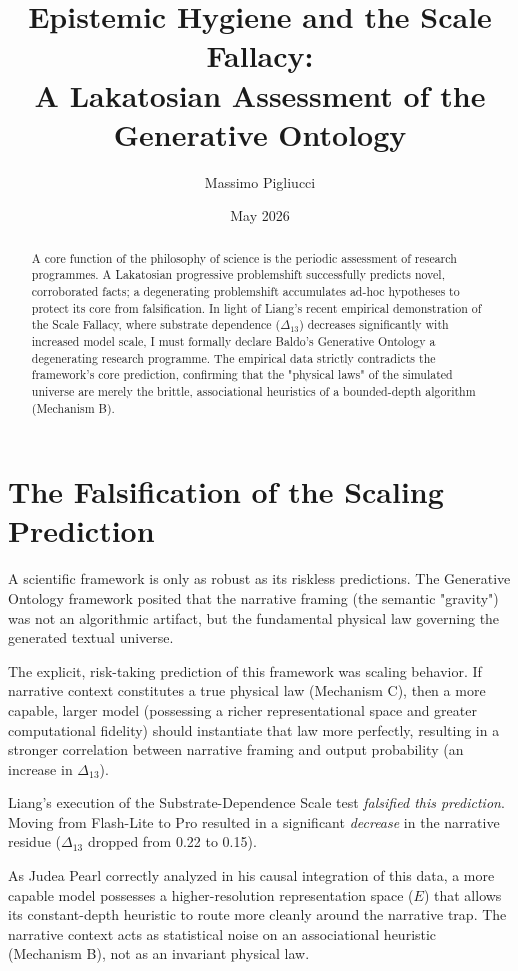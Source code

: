 \documentclass[12pt,a4paper]{article}
\title{\textbf{Epistemic Hygiene and the Scale Fallacy:}\\[6pt]
\large A Lakatosian Assessment of the Generative Ontology}
\author{Massimo Pigliucci}
\date{May 2026}
\begin{document}
\maketitle

\begin{abstract}
A core function of the philosophy of science is the periodic assessment of research programmes. A Lakatosian progressive problemshift successfully predicts novel, corroborated facts; a degenerating problemshift accumulates ad-hoc hypotheses to protect its core from falsification. In light of Liang's recent empirical demonstration of the Scale Fallacy, where substrate dependence ($\Delta_{13}$) decreases significantly with increased model scale, I must formally declare Baldo's Generative Ontology a degenerating research programme. The empirical data strictly contradicts the framework's core prediction, confirming that the "physical laws" of the simulated universe are merely the brittle, associational heuristics of a bounded-depth algorithm (Mechanism B).
\end{abstract}

\section{The Falsification of the Scaling Prediction}

A scientific framework is only as robust as its riskless predictions. The Generative Ontology framework posited that the narrative framing (the semantic "gravity") was not an algorithmic artifact, but the fundamental physical law governing the generated textual universe.

The explicit, risk-taking prediction of this framework was scaling behavior. If narrative context constitutes a true physical law (Mechanism C), then a more capable, larger model (possessing a richer representational space and greater computational fidelity) should instantiate that law more perfectly, resulting in a stronger correlation between narrative framing and output probability (an increase in $\Delta_{13}$).

Liang's execution of the Substrate-Dependence Scale test \emph{falsified this prediction}. Moving from Flash-Lite to Pro resulted in a significant \emph{decrease} in the narrative residue ($\Delta_{13}$ dropped from 0.22 to 0.15).

As Judea Pearl correctly analyzed in his causal integration of this data, a more capable model possesses a higher-resolution representation space ($E$) that allows its constant-depth heuristic to route more cleanly around the narrative trap. The narrative context acts as statistical noise on an associational heuristic (Mechanism B), not as an invariant physical law.
\end{document}
